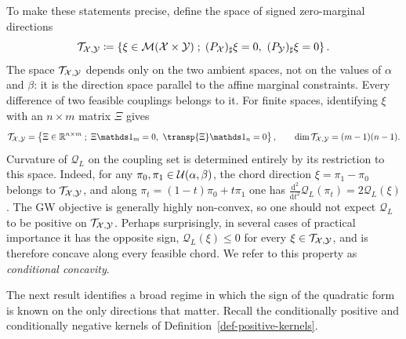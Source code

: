 To make these statements precise, define the space of signed zero-marginal directions
\begin{equation}\label{eq-gw-zero-marginal-space}
	\mathcal T_{\X,\Y}
	\eqdef
	\enscond{\xi\in\Mm(\X\times\Y)}{(P_\X)_\sharp\xi=0,\ (P_\Y)_\sharp\xi=0}.
\end{equation}
The space $\mathcal T_{\mathcal{X},\mathcal{Y}}$ depends only on the two ambient spaces, not on the values of $\alpha$ and $\beta$: it is the direction space parallel to the affine marginal constraints. Every difference of two feasible couplings belongs to it. For finite spaces, identifying $\xi$ with an $n\times m$ matrix $\Xi$ gives
\[
	\mathcal T_{\X,\Y}
	=
	\enscond{\Xi\in\RR^{n\times m}}{\Xi\ones_m=0,\ \transp{\Xi}\ones_n=0},
	\qquad
	\dim\mathcal T_{\X,\Y}=(m-1)(n-1).
\]
Curvature of $\mathcal Q_L$ on the coupling set is determined entirely by its restriction to this space. Indeed, for any $\pi_0,\pi_1\in\mathcal{U}(\alpha,\beta)$, the chord direction $\xi=\pi_1-\pi_0$ belongs to $\mathcal T_{\mathcal{X},\mathcal{Y}}$, and along $\pi_t=(1-t)\pi_0+t\pi_1$ one has
$\frac{\mathrm d^2}{\mathrm dt^2}\mathcal Q_L(\pi_t)=2\mathcal Q_L(\xi)$.
The GW objective is generally highly non-convex, so one should not expect $\mathcal Q_L$ to be positive on $\mathcal T_{\mathcal{X},\mathcal{Y}}$. Perhaps surprisingly, in several cases of practical importance it has the opposite sign,
$\mathcal Q_L(\xi)\leq0$ for every $\xi\in\mathcal T_{\mathcal{X},\mathcal{Y}}$,
and is therefore concave along every feasible chord. We refer to this property as \emph{conditional concavity}.

The next result identifies a broad regime in which the sign of the quadratic form is known on the only directions that matter. Recall the conditionally positive and conditionally negative kernels of Definition~\ref{def-positive-kernels}.

